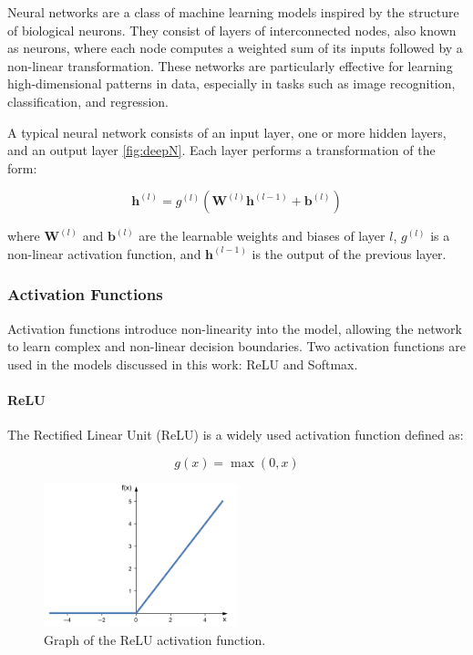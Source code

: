 \documentclass{pracalicmgr}
\begin{document}
Neural networks are a class of machine learning models inspired by the structure of biological neurons. They consist of layers of interconnected nodes, also known as neurons, where each node computes a weighted sum of its inputs followed by a non-linear transformation. These networks are particularly effective for learning high-dimensional patterns in data, especially in tasks such as image recognition, classification, and regression.

A typical neural network consists of an input layer, one or more hidden layers, and an output layer \ref{fig:deepN}. Each layer performs a transformation of the form:

\[
\mathbf{h}^{(l)} = g^{(l)}(\mathbf{W}^{(l)} \mathbf{h}^{(l-1)} + \mathbf{b}^{(l)})
\]

where \( \mathbf{W}^{(l)} \) and \( \mathbf{b}^{(l)} \) are the learnable weights and biases of layer \( l \), \( g^{(l)} \) is a non-linear activation function, and \( \mathbf{h}^{(l-1)} \) is the output of the previous layer.

\subsubsection{Activation Functions}

Activation functions introduce non-linearity into the model, allowing the network to learn complex and non-linear decision boundaries. Two activation functions are used in the models discussed in this work: ReLU and Softmax.

\paragraph{ReLU}

The Rectified Linear Unit (ReLU) is a widely used activation function defined as:

\[
g(x) = \max(0, x)
\]

\begin{figure}[H]
\centering
\includegraphics[width=0.5\textwidth]{src/relu.png}
\caption{Graph of the ReLU activation function.\cite{raschkaRelu}}
\label{fig:relu}
\end{figure}
\end{document}
